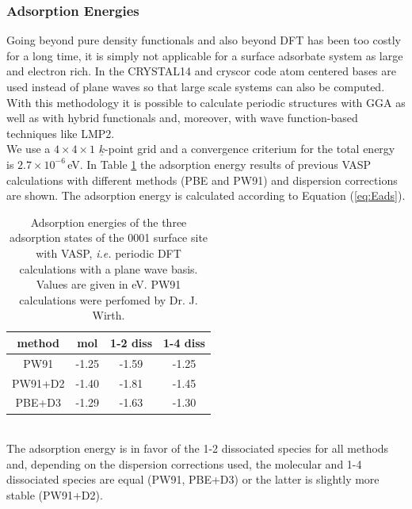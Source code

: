 \documentclass[11pt,DIV=13,BCOR=5mm,a4paper,headinclude]{scrbook}
\renewcommand{\vec}[1]{\underline{#1}}
\begin{document}
\subsubsection{Adsorption Energies}
Going beyond pure density functionals and also beyond DFT has been too costly for a long time, it is simply not applicable for a surface adsorbate system as large and electron rich.
In the CRYSTAL14\cite{crystal14} and cryscor\cite{cryscor} code atom centered bases are used instead of plane waves so that large scale systems can also be computed.
With this methodology it is possible to calculate periodic structures with GGA as well as with hybrid functionals and, moreover, with wave function-based techniques like LMP2.\\
We use a $4\times 4 \times 1$ $\vec{k}$-point grid and a convergence criterium for the total energy is $2.7\times 10^{-6}\,$eV.
In Table \ref{tab:vasp-results} the adsorption energy results of previous VASP calculations with different methods (PBE and PW91) and dispersion corrections are shown.
The adsorption energy is calculated according to Equation (\ref{eq:Eads}).
\begin{table}[!h]
  \centering
   \caption{Adsorption energies of the three adsorption states of the 0001 surface site with VASP, \textit{i.e.}
periodic DFT calculations with a plane wave basis.
Values are given in eV.
PW91 calculations were perfomed by Dr. J. Wirth.}
  \begin{tabular}{c|ccc}%
  \toprule
  method & mol & 1-2 diss & 1-4 diss\\\midrule %
  PW91   &-1.25 &-1.59 &-1.25 \\%
  PW91+D2&-1.40 &-1.81 &-1.45 \\%
  PBE+D3 &-1.29&-1.63 &-1.30 \\\bottomrule%
  \end{tabular}
  \label{tab:vasp-results}
 \end{table}
\\

The adsorption energy is in favor of the 1-2 dissociated species for all methods and, depending on the dispersion corrections used, the molecular and 1-4 dissociated species are equal (PW91, PBE+D3) or the latter is slightly more stable (PW91+D2).
\end{document}
